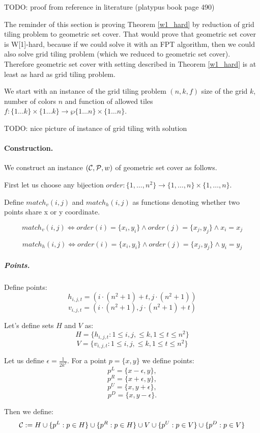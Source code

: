 TODO: proof from reference in literature (platypus book page 490)

The reminder of this section is proving Theorem \ref{w1_hard}
by reduction of grid tiling problem to geometric set cover.
That would prove that geometric set cover is W[1]-hard,
because if we could solve it with an FPT algorithm,
then we could also solve grid tiling problem
(which we reduced to geometric set cover).
Therefore geometric set cover with setting
described in Theorem \ref{w1_hard}
is at least as hard as grid tiling problem.

We start with an instance of the grid tiling problem $(n, k, f)$
size of the
grid $k$, number of colors $n$
and function of allowed tiles
$f : \{1 \ldots k\} \times \{1 \ldots k\} \rightarrow \wp\{1 \ldots n\} \times \{1 \ldots n\}$.

TODO: nice picture of instance of grid tiling with solution

\paragraph{Construction.}
We construct an instance $(\mathcal{C}, \mathcal{P}, w)$ of geometric set cover as follows.

First let us choose any bijection
$order : \{1, \ldots, n^2\} \rightarrow \{1, \ldots, n\} \times \{1, \ldots, n\}$.

Define $match_v(i, j)$ and $match_h(i, j)$
as functions denoting whether two points share x or y coordinate.

$$match_v(i, j) \iff
order(i) = \{x_i, y_i\} \land order(j) = \{x_j, y_j\} \land x_i = x_j$$

$$match_h(i, j) \iff
order(i) = \{x_i, y_i\} \land order(j) = \{x_j, y_j\} \land y_i = y_j$$


\subparagraph{Points.}

Define points:
	$$h_{i, j, t} = (i \cdot (n^2+1) + t, j \cdot (n^2+1))$$
	$$v_{i, j, t} = (i \cdot (n^2+1), j \cdot (n^2+1) + t)$$
	
Let's define sets $H$ and $V$ as:
$$H = \{h_{i, j, t} : 1 \le i, j, \le k, 1 \le t \le n^2\}$$
$$V = \{v_{i, j, t} : 1 \le i, j, \le k, 1 \le t \le n^2\}$$
	
Let us define $\epsilon = \frac{1}{2k^2}$.
For a point $p = \{x, y\}$ we define points:
$$p^{L} = \{x - \epsilon, y\},$$
$$p^{R} = \{x + \epsilon, y\},$$
$$p^{U} = \{x, y + \epsilon\},$$
$$p^{D} = \{x, y - \epsilon\}.$$

Then we define:
$$\mathcal{C} := H \cup \{p^L : p \in H\} \cup \{p^R : p \in H\}
\cup V \cup \{p^U : p \in V\} \cup \{p^D : p \in V\} $$


